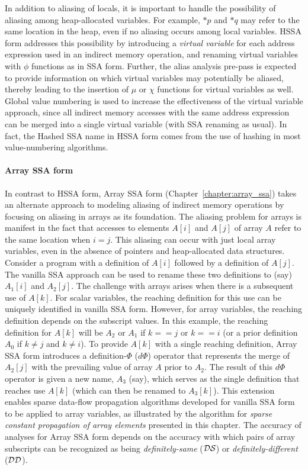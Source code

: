 In addition to aliasing of locals, it is important to handle the possibility of  aliasing among heap-allocated variables.  For example, $*p$ and $*q$ may refer to the same location in the heap, even if no aliasing occurs among local variables.  HSSA form addresses this possibility by introducing a {\em virtual variable} for each address expression used in an indirect memory operation, and renaming virtual variables with $\phi$ functions as in SSA form.  Further, the alias analysis pre-pass is expected to provide information on which virtual variables may potentially be aliased, thereby leading to the insertion of $\mu$ or $\chi$ functions for virtual variables as well.  Global value numbering is used to increase the effectiveness of the virtual variable approach, since all indirect memory accesses with the same address expression can be merged into a single virtual variable (with SSA renaming as usual).  In fact, the Hashed SSA name in HSSA form comes from the use of hashing in most value-numbering algorithms.

\paragraph{Array SSA form}

In contrast to HSSA form, Array SSA form (Chapter~\ref{chapter:array_ssa}) takes an alternate approach to modeling aliasing of indirect memory operations by focusing on aliasing in arrays as its foundation.  The aliasing problem for arrays is manifest in the fact that accesses to elements $A[i]$ and $A[j]$ of array $A$ refer to the same location when $i = j$.  This aliasing can occur with just local array variables, even in the absence of pointers and heap-allocated data structures.  Consider a program with a definition of $A[i]$ followed by a definition of $A[j]$.  The vanilla SSA approach can be used to rename these two definitions to (say) $A_1[i]$ and $A_2[j]$.  The challenge with arrays arises when there is a subsequent use of $A[k]$.  For scalar variables, the reaching definition for this use can be uniquely identified in vanilla SSA form.  However, for array variables, the reaching definition depends on the subscript values.  In this example, the reaching definition for $A[k]$ will be $A_2$ or $A_1$ if $k == j$ or $k == i$ (or a prior definition $A_0$ if $k \not= j$ and $k \not= i$).  To provide $A[k]$ with a single reaching definition, 
Array SSA form introduces a definition-$\Phi$ ($d\Phi$) operator that represents the merge of $A_2[j]$ with the prevailing value of array $A$ prior to $A_2$.  The result of this $d\Phi$ operator is given a new name, $A_3$ (say), which serves as the single definition that reaches use $A[k]$ (which can then be renamed to $A_3[k]$).  This extension enables sparse data-flow propagation algorithms developed for vanilla SSA form to be applied to array variables, as illustrated by the algorithm for {\em  sparse constant propagation of array elements} presented in this chapter.  The accuracy of analyses for Array SSA form depends on the accuracy with which pairs of array subscripts can be recognized as being {\em definitely-same} (${\cal DS}$) or {\em definitely-different} (${\cal DD}$).

